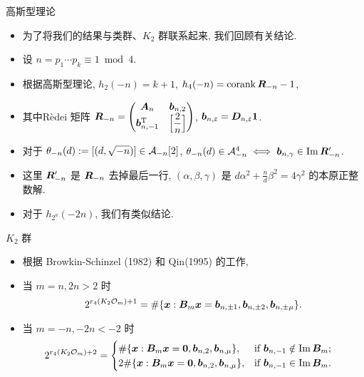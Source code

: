 \documentclass[aspectratio=169,handout]{ctexbeamer}
\renewcommand\aleg[2]{\Bigl[\dfrac{{#1}}{#2}\Bigr]}
\begin{document}
\begin{frame}{高斯型理论}
  \begin{itemize}
    \item 为了将我们的结果与类群、$K_2$ 群联系起来, 我们回顾有关结论.
    \item 设 $n=p_1\cdots p_k\equiv 1\bmod 4$.
    \item 根据高斯型理论, $h_2(-n)=k+1$,  $h_4(-n)=\operatorname{corank} {\boldsymbol{R}}_{-n}-1$,
    \item 其中R\`edei 矩阵 $\bfR_{-n}=\begin{pmatrix}
			\bfA_n&\bfb_{n,2}\\
			\bfb_{n,-1}^\rmT&\aleg{2}{n}
		\end{pmatrix}$, ${\boldsymbol{b}}_{n,\varepsilon}={\boldsymbol{D}}_{n,\varepsilon}{\bf1}$.
    \item 对于 $\theta_{-n}(d):=[(d,\sqrt{-n})]\in{\mathcal{A}}_{-n}[2]$, $\theta_{-n}(d)\in {\mathcal{A}}_{-n}^4\iff {\boldsymbol{b}}_{n,\gamma}\in \operatorname{Im}{\boldsymbol{R}}_{-n}'$.
    \item 这里 ${\boldsymbol{R}}_{-n}'$ 是 ${\boldsymbol{R}}_{-n}$ 去掉最后一行, $(\alpha,\beta,\gamma)$ 是 $d\alpha^2+\frac{n}{d}\beta^2=4\gamma^2$ 的本原正整数解.
    \item 对于 $h_{2^a}(-2n)$, 我们有类似结论.
  \end{itemize}
\end{frame}


\begin{frame}{$K_2$ 群}
  \begin{itemize}
    \item 根据 Browkin-Schinzel (1982) 和 Qin(1995) 的工作, 
    \item 当 $m=n,2n>2$ 时
    \[
      2^{r_4(K_2{\mathcal{O}}_m)+1}=\#\{{\boldsymbol{x}}:{\boldsymbol{B}}_m{\boldsymbol{x}}={\boldsymbol{b}}_{n,\pm1},{\boldsymbol{b}}_{n,\pm2},{\boldsymbol{b}}_{n,\pm\mu}\}.
    \]
    \item 当 $m=-n,-2n<-2$ 时
    \[
      \begin{aligned}	
        2^{r_4(K_2\CO_m)+2}&
        =\begin{cases}
          \#\{\bfx:\bfB_m\bfx={\bf0},\bfb_{n,2},\bfb_{n,\mu}\},&\text{if}\ \bfb_{n,-1}\notin\Im \bfB_m;\\
          2\#\{\bfx:\bfB_m\bfx={\bf0},\bfb_{n,2},\bfb_{n,\mu}\},&\text{if}\ \bfb_{n,-1}\in\Im \bfB_m.
        \end{cases}
      \end{aligned}
    \]
  \end{itemize}
\end{frame}
\end{document}
